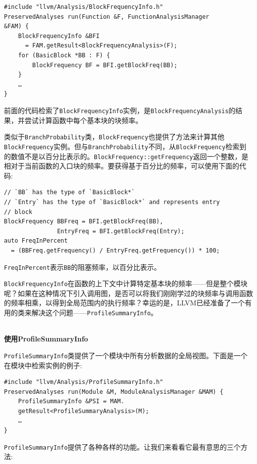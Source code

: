 \begin{lstlisting}[style=styleCXX]
#include "llvm/Analysis/BlockFrequencyInfo.h"
PreservedAnalyses run(Function &F, FunctionAnalysisManager
&FAM) {
	BlockFrequencyInfo &BFI
	  = FAM.getResult<BlockFrequencyAnalysis>(F);
	for (BasicBlock *BB : F) {
		BlockFrequency BF = BFI.getBlockFreq(BB);
	}
	…
}
\end{lstlisting}

前面的代码检索了\texttt{BlockFrequencyInfo}实例，是\texttt{BlockFrequencyAnalysis}的结果，并尝试计算函数中每个基本块的块频率。

类似于\texttt{BranchProbability}类，\texttt{BlockFrequency}也提供了方法来计算其他\texttt{BlockFrequency}实例。但与\texttt{BranchProbability}不同，从\texttt{BlockFrequency}检索到的数值不是以百分比表示的。\texttt{BlockFrequency::getFrequency}返回一个整数，是相对于当前函数的入口块的频率。要获得基于百分比的频率，可以使用下面的代码:

\begin{lstlisting}[style=styleCXX]
// `BB` has the type of `BasicBlock*`
// `Entry` has the type of `BasicBlock*` and represents entry
// block
BlockFrequency BBFreq = BFI.getBlockFreq(BB),
               EntryFreq = BFI.getBlockFreq(Entry);
auto FreqInPercent
  = (BBFreq.getFrequency() / EntryFreq.getFrequency()) * 100;
\end{lstlisting}

\texttt{FreqInPercent}表示\texttt{BB}的阻塞频率，以百分比表示。

\texttt{BlockFrequencyInfo}在函数的上下文中计算特定基本块的频率——但是整个模块呢？如果在这种情况下引入调用图，是否可以将我们刚刚学过的块频率与调用函数的频率相乘，以得到全局范围内的执行频率？幸运的是，LLVM已经准备了一个有用的类来解决这个问题——\texttt{ProfileSummaryInfo}。

\hspace*{\fill} \\ %
\noindent
\textbf{使用ProfileSummaryInfo}

\texttt{ProfileSummaryInfo}类提供了一个模块中所有分析数据的全局视图。下面是一个在模块中检索实例的例子:

\begin{lstlisting}[style=styleCXX]
#include "llvm/Analysis/ProfileSummaryInfo.h"
PreservedAnalyses run(Module &M, ModuleAnalysisManager &MAM) {
	ProfileSummaryInfo &PSI = MAM.
	getResult<ProfileSummaryAnalysis>(M);
	…
}
\end{lstlisting}

\texttt{ProfileSummaryInfo}提供了各种各样的功能。让我们来看看它最有意思的三个方法:

